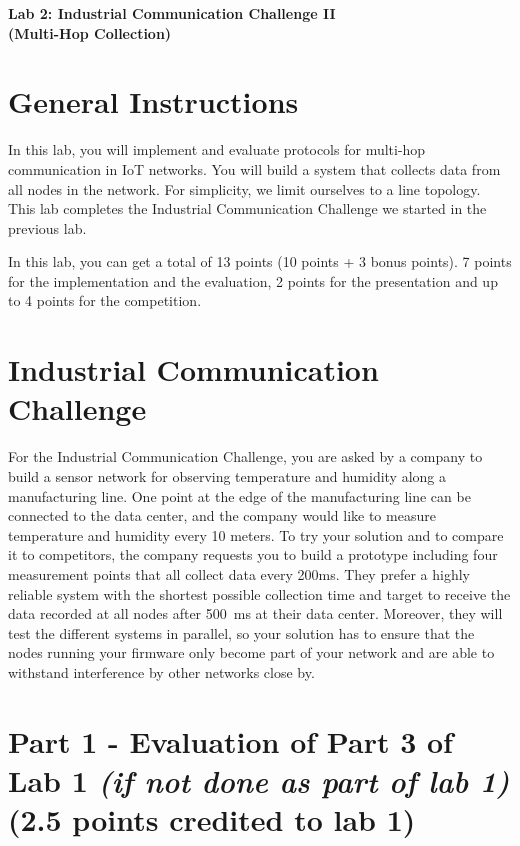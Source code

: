 \documentclass[11pt]{article}
\begin{document}
\begin{center}
{\Large \bf Lab 2: Industrial Communication Challenge II\\(Multi-Hop Collection) }
\end{center}


\section*{General Instructions}

In this lab, you will implement and evaluate protocols for multi-hop communication in IoT networks. You will build a system that collects data from all nodes in the network. For simplicity, we limit ourselves to a line topology. This lab completes the Industrial Communication Challenge we started in the previous lab.

In this lab, you can get a total of 13 points (10 points + 3 bonus points). 7 points for the implementation and the evaluation, 2 points for the presentation and up to 4 points for the competition.

\section*{Industrial Communication Challenge}

For the Industrial Communication Challenge, you are asked by a company to build a sensor network for observing temperature and humidity along a manufacturing line. One point at the edge of the manufacturing line can be connected to the data center, and the company would like to measure temperature and humidity every 10 meters. To try your solution and to compare it to competitors, the company requests you to build a prototype including four measurement points that all collect data every 200ms. They prefer a highly reliable system with the shortest possible collection time and target to receive the data recorded at all nodes after 500~ms at their data center. Moreover, they will test the different systems in parallel, so your solution has to ensure that the nodes running your firmware only become part of your network and are able to withstand interference by other networks close by.

\section*{Part 1 - Evaluation of Part 3 of Lab 1 \textit{(if not done as part of lab 1)} (2.5 points credited to lab 1)}
\end{document}
